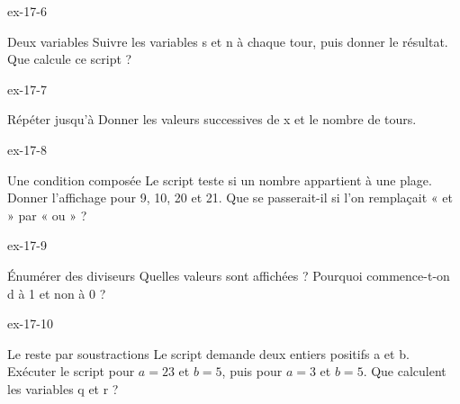 \clearpage{}
\begin{blocLivre}{ex-17-6}\begin{exercice}[2]{Deux variables}
Suivre les variables s et n à chaque tour, puis donner le résultat. Que calcule ce script ?
\label{fig-ex-17-6}
\end{exercice}\end{blocLivre}
\begin{blocLivre}{ex-17-7}\begin{exercice}[2]{Répéter jusqu’à}
Donner les valeurs successives de x et le nombre de tours.
\label{fig-ex-17-7}
\end{exercice}\end{blocLivre}
\begin{blocLivre}{ex-17-8}\begin{exercice}[2]{Une condition composée}
Le script teste si un nombre appartient à une plage. Donner l’affichage pour 9, 10, 20 et 21. Que se passerait-il si l’on remplaçait « et » par « ou » ?
\label{fig-ex-17-8}
\end{exercice}\end{blocLivre}
\begin{blocLivre}{ex-17-9}\begin{exercice}[2]{Énumérer des diviseurs}
Quelles valeurs sont affichées ? Pourquoi commence-t-on d à 1 et non à 0 ?
\label{fig-ex-17-9}
\end{exercice}\end{blocLivre}
\begin{blocLivre}{ex-17-10}\begin{exercice}[2]{Le reste par soustractions}
Le script demande deux entiers positifs a et b. Exécuter le script pour $a=23$ et $b=5$, puis pour $a=3$ et $b=5$. Que calculent les variables q et r ?
\label{fig-ex-17-10}
\end{exercice}\end{blocLivre}

